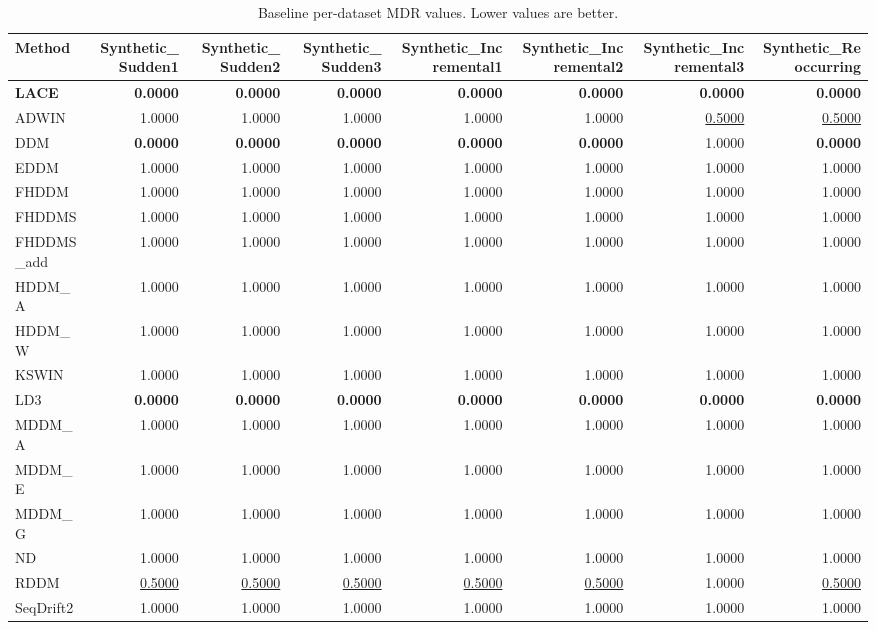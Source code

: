 \begin{table}
\caption{Baseline per-dataset MDR values. Lower values are better.}
\label{tab:per-data-baseline-missed-detection-rate}
\begin{tabular}{lrrrrrrr}
\toprule
Method & Synthetic\_Sudden1 & Synthetic\_Sudden2 & Synthetic\_Sudden3 & Synthetic\_Incremental1 & Synthetic\_Incremental2 & Synthetic\_Incremental3 & Synthetic\_Reoccurring \\
\midrule
\textbf{LACE} & \textbf{0.0000} & \textbf{0.0000} & \textbf{0.0000} & \textbf{0.0000} & \textbf{0.0000} & \textbf{0.0000} & \textbf{0.0000} \\
ADWIN & 1.0000 & 1.0000 & 1.0000 & 1.0000 & 1.0000 & \underline{0.5000} & \underline{0.5000} \\
DDM & \textbf{0.0000} & \textbf{0.0000} & \textbf{0.0000} & \textbf{0.0000} & \textbf{0.0000} & 1.0000 & \textbf{0.0000} \\
EDDM & 1.0000 & 1.0000 & 1.0000 & 1.0000 & 1.0000 & 1.0000 & 1.0000 \\
FHDDM & 1.0000 & 1.0000 & 1.0000 & 1.0000 & 1.0000 & 1.0000 & 1.0000 \\
FHDDMS & 1.0000 & 1.0000 & 1.0000 & 1.0000 & 1.0000 & 1.0000 & 1.0000 \\
FHDDMS\_add & 1.0000 & 1.0000 & 1.0000 & 1.0000 & 1.0000 & 1.0000 & 1.0000 \\
HDDM\_A & 1.0000 & 1.0000 & 1.0000 & 1.0000 & 1.0000 & 1.0000 & 1.0000 \\
HDDM\_W & 1.0000 & 1.0000 & 1.0000 & 1.0000 & 1.0000 & 1.0000 & 1.0000 \\
KSWIN & 1.0000 & 1.0000 & 1.0000 & 1.0000 & 1.0000 & 1.0000 & 1.0000 \\
LD3 & \textbf{0.0000} & \textbf{0.0000} & \textbf{0.0000} & \textbf{0.0000} & \textbf{0.0000} & \textbf{0.0000} & \textbf{0.0000} \\
MDDM\_A & 1.0000 & 1.0000 & 1.0000 & 1.0000 & 1.0000 & 1.0000 & 1.0000 \\
MDDM\_E & 1.0000 & 1.0000 & 1.0000 & 1.0000 & 1.0000 & 1.0000 & 1.0000 \\
MDDM\_G & 1.0000 & 1.0000 & 1.0000 & 1.0000 & 1.0000 & 1.0000 & 1.0000 \\
ND & 1.0000 & 1.0000 & 1.0000 & 1.0000 & 1.0000 & 1.0000 & 1.0000 \\
RDDM & \underline{0.5000} & \underline{0.5000} & \underline{0.5000} & \underline{0.5000} & \underline{0.5000} & 1.0000 & \underline{0.5000} \\
SeqDrift2 & 1.0000 & 1.0000 & 1.0000 & 1.0000 & 1.0000 & 1.0000 & 1.0000 \\
\bottomrule
\end{tabular}
\end{table}
